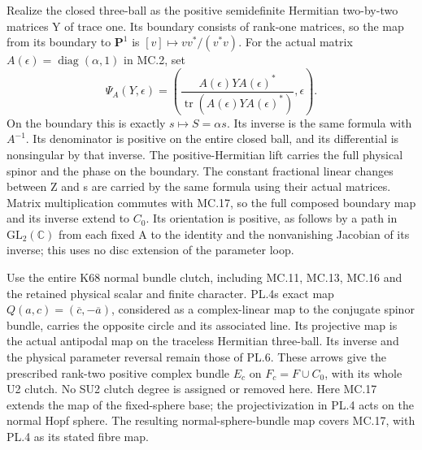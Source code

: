 Realize the closed three-ball as the positive semidefinite
Hermitian two-by-two matrices Y of trace one. Its boundary
consists of rank-one matrices, so the map from its boundary
to \(\mathbf P^1\) is \([v]\mapsto vv^*/(v^*v)\). For
the actual matrix \(A(\epsilon)=\operatorname{diag}(\alpha,1)\)
in MC.2, set
\[
 \Psi_A(Y,\epsilon)=
 \left(\frac{A(\epsilon)YA(\epsilon)^*}
                   {\operatorname{tr}(A(\epsilon)YA(\epsilon)^*)},
       \epsilon\right).                               \tag{MC.17}
\]
On the boundary this is exactly \(s\mapsto S=\alpha s\).
Its inverse is the same formula with \(A^{-1}\). Its
denominator is positive on the entire closed ball, and
its differential is nonsingular by that inverse. The
positive-Hermitian lift carries the full physical spinor
and the phase on the boundary. The constant fractional
linear changes between Z and s are carried by the same
formula using their actual matrices. Matrix multiplication
commutes with MC.17, so the full composed boundary map
and its inverse extend to \(C_0\). Its orientation is
positive, as follows by a path in \(\mathrm{GL}_2(\mathbb C)\)
from each fixed A to the identity and the nonvanishing
Jacobian of its inverse; this uses no disc extension of
the parameter loop.

Use the entire K68 normal bundle clutch, including MC.11,
MC.13, MC.16 and the retained physical scalar and finite
character. PL.4\textquotesingle s exact map
\(Q(a,c)=(\overline c,-\overline a)\), considered as
a complex-linear map to the conjugate spinor bundle,
carries the opposite circle and its associated line.
Its projective map is the actual antipodal map on the
traceless Hermitian three-ball. Its inverse and the
physical parameter reversal remain those of PL.6.
These arrows give the prescribed rank-two positive
complex bundle \(E_c\) on
\(F_c=F\cup C_0\), with its whole U2 clutch. No SU2
clutch degree is assigned or removed here.
Here MC.17 extends the map of the fixed-sphere base;
the projectivization in PL.4 acts on the normal Hopf
sphere. The resulting normal-sphere-bundle map covers
MC.17, with PL.4 as its stated fibre map.

